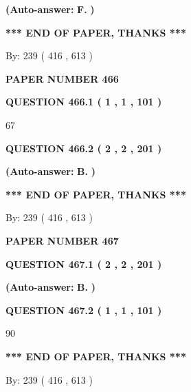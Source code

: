 \documentclass[12pt]{article}
\begin{document}
 
{\textbf{(Auto-answer:}}
{\textbf{\large{
F.}}}
{\textbf{)}}
 
 
   
   
   
   
\vspace{1.0in} 
{\textbf{\large{ *** END OF PAPER, THANKS *** }}} 
   
   
\hspace{1.0in} By: 
 239 ( 416 ,  613 )
   
   
   
   
\newpage 
\setcounter{page}{ 
   466001 } 
   
   
 {\textbf{ \Large{ PAPER NUMBER  466  }}}
   
   
   
   
  
  
{\textbf{\large{QUESTION
466.1 
 ( 1 , 1 , 101 )
}}}

67
  
  
{\textbf{\large{QUESTION
466.2 
 ( 2 , 2 , 201 )
}}}
 
 
{\textbf{(Auto-answer:}}
{\textbf{\large{
B.}}}
{\textbf{)}}
 
 
   
   
   
   
\vspace{1.0in} 
{\textbf{\large{ *** END OF PAPER, THANKS *** }}} 
   
   
\hspace{1.0in} By: 
 239 ( 416 ,  613 )
   
   
   
   
\newpage 
\setcounter{page}{ 
   467001 } 
   
   
 {\textbf{ \Large{ PAPER NUMBER  467  }}}
   
   
   
   
  
  
{\textbf{\large{QUESTION
467.1 
 ( 2 , 2 , 201 )
}}}
 
 
{\textbf{(Auto-answer:}}
{\textbf{\large{
B.}}}
{\textbf{)}}
 
 
  
  
{\textbf{\large{QUESTION
467.2 
 ( 1 , 1 , 101 )
}}}

90
   
   
   
   
\vspace{1.0in} 
{\textbf{\large{ *** END OF PAPER, THANKS *** }}} 
   
   
\hspace{1.0in} By: 
 239 ( 416 ,  613 )
   
   
   
\end{document}
